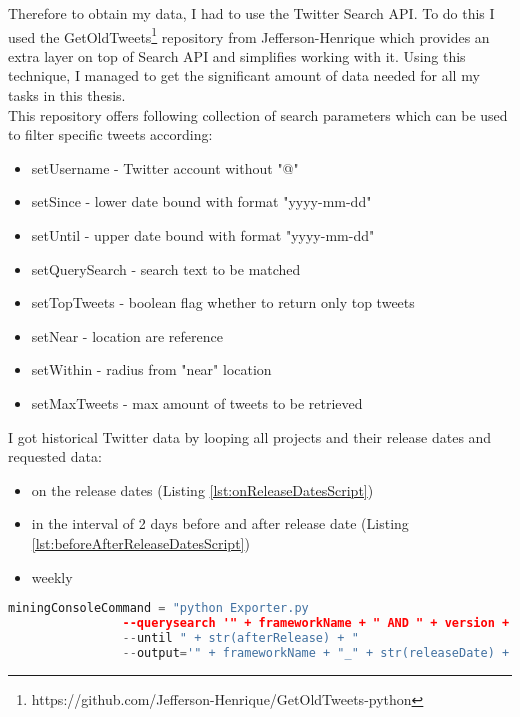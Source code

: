 Therefore to obtain my data, I had to use the Twitter Search API. To do this I used the GetOldTweets\footnote{https://github.com/Jefferson-Henrique/GetOldTweets-python} repository from Jefferson-Henrique which provides an extra layer on top of Search API and simplifies working with it. Using this technique, I managed to get the significant amount of data needed for all my tasks in this thesis.\\
This repository offers following collection of search parameters which can be used to filter specific tweets according:
\begin{itemize}
  \item setUsername - Twitter account without "@"
  \item setSince - lower date bound with format "yyyy-mm-dd"
  \item setUntil - upper date bound with format "yyyy-mm-dd"
  \item setQuerySearch - search text to be matched
  \item setTopTweets - boolean flag whether to return only top tweets
  \item setNear - location are reference 
  \item setWithin - radius from "near" location
  \item setMaxTweets - max amount of tweets to be retrieved
\end{itemize}


I got historical Twitter data by looping all projects and their release dates and requested data: 

\begin{itemize}
  \item on the release dates (Listing \ref{lst:onReleaseDatesScript})
  \item in the interval of 2 days before and after  release date (Listing \ref{lst:beforeAfterReleaseDatesScript})
  \item weekly
\end{itemize}


\begin{lstlisting}[caption={Creating command to get Tweets about a project version on release dates},label={lst:onReleaseDatesScript},language=Python]
miningConsoleCommand = "python Exporter.py 
				--querysearch '" + frameworkName + " AND " + version + "'    --since " + str(releaseDate) + " 
				--until " + str(afterRelease) + " 
				--output='" + frameworkName + "_" + str(releaseDate) + ".csv" + "'"
\end{lstlisting}


